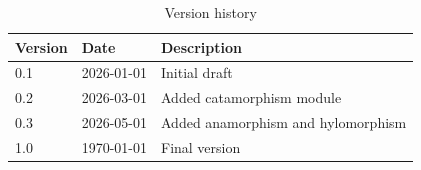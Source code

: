 \begin{abstract}
\noindent
REPLACE\_WITH\_ABSTRACT: a short (150--250 word) summary of the library —
what recursive datatypes and recursion patterns (catamorphisms, anamorphisms,
hylomorphisms, \dots) it implements, what problems motivated each module,
and the main results or properties established along the way. Write this
last, once the rest of the document is finished.
\end{abstract}

\vfill

\begin{table}[h]
\centering
\begin{tabular}{lll}
\toprule
\textbf{Version} & \textbf{Date}      & \textbf{Description} \\
\midrule
0.1              & 2026-01-01         & Initial draft \\
0.2              & 2026-03-01         & Added catamorphism module \\
0.3              & 2026-05-01         & Added anamorphism and hylomorphism \\
1.0              & \today             & Final version \\
\bottomrule
\end{tabular}
\caption*{Version history}
\end{table}

\newpage
